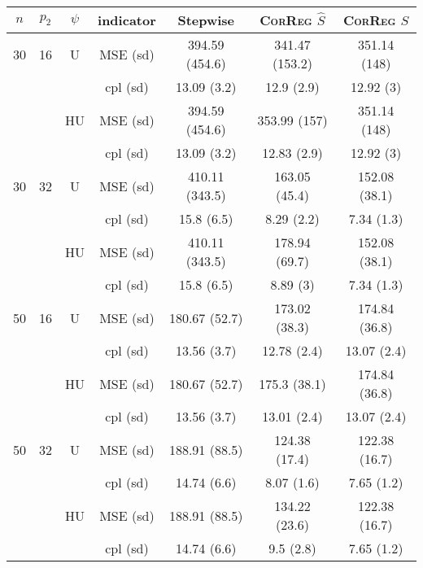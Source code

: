 \documentclass[11pt,a4paper]{article}
\begin{document}
\begin{table}[h!]
\centering
\begin{tabular}{|c|c|c|c|c|c|c|}
\hline 
$n$ & $p_2$&  $\psi$ &indicator &Stepwise  &    \textsc{CorReg} $\hat S$& \textsc{CorReg} $S$\\ 
\hline %
30 & 16 & U&MSE (sd) & 394.59 (454.6) & 341.47 (153.2) & 351.14 (148) \\
& & & cpl (sd) & 13.09 (3.2) & 12.9 (2.9) & 12.92 (3) \\
 &  &HU &MSE (sd) & 394.59 (454.6) & 353.99 (157) & 351.14 (148) \\
& & & cpl (sd) & 13.09 (3.2) & 12.83 (2.9) & 12.92 (3) \\
\hline %
30 & 32 & U & MSE (sd) & 410.11 (343.5) & 163.05 (45.4) & 152.08 (38.1) \\
& & & cpl (sd) & 15.8 (6.5) & 8.29 (2.2) & 7.34 (1.3) \\
 &  & HU & MSE (sd) & 410.11 (343.5) & 178.94 (69.7) & 152.08 (38.1) \\
& & & cpl (sd) & 15.8 (6.5) & 8.89 (3) & 7.34 (1.3) \\
\hline
\hline %
50 & 16 & U&	MSE (sd) & 180.67 (52.7) & 173.02 (38.3) & 174.84 (36.8) \\
& & & cpl (sd) & 13.56 (3.7) & 12.78 (2.4) & 13.07 (2.4) \\
 &  &HU &MSE (sd) & 180.67 (52.7) & 175.3 (38.1) & 174.84 (36.8) \\
& & & cpl (sd) & 13.56 (3.7) & 13.01 (2.4) & 13.07 (2.4) \\
\hline %
50 & 32 & U&MSE (sd) & 188.91 (88.5) & 124.38 (17.4) & 122.38 (16.7) \\
& & & cpl (sd) & 14.74 (6.6) & 8.07 (1.6) & 7.65 (1.2) \\
 &  &HU &MSE (sd) & 188.91 (88.5) & 134.22 (23.6) & 122.38 (16.7) \\
& & &cpl (sd) & 14.74 (6.6) & 9.5 (2.8) & 7.65 (1.2) \\

\end{tabular}
\end{table}
\end{document}
